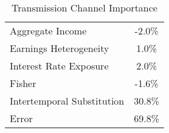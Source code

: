     \begin{table}  
\begin{center} 
\caption{Transmission Channel Importance}\label{table:trans_channel}\begin{tabular}{lc}  
\toprule 
Aggregate Income & -2.0\% 
\\ Earnings Heterogeneity & 1.0\% 
\\ Interest Rate Exposure & 2.0\% 
\\ Fisher & -1.6\% 
\\ Intertemporal Substitution & 30.8\% 
\\ Error & 69.8\% 
\\ \bottomrule  
 \end{tabular}   
\end{center} 
\end{table}  
